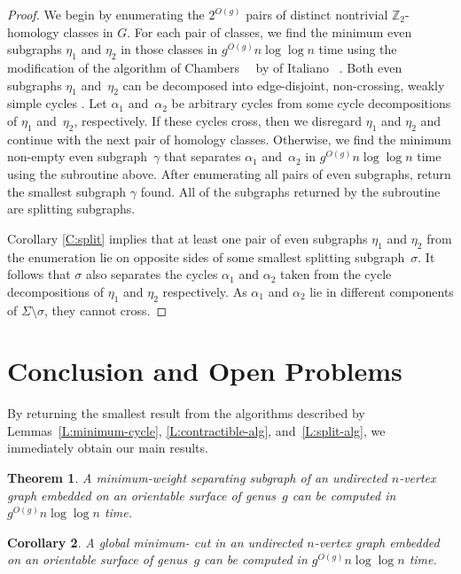 \documentclass[twoside,leqno,twocolumn]{article}
\def\Z{\mathbb{Z}}
\newtheorem{theorem}{Theorem}[section]
\newtheorem{corollary}[theorem]{Corollary}
\begin{document}
\begin{proof}
We begin by enumerating the $2^{O(g)}$ pairs of distinct nontrivial $\Z_2$-homology classes in $G$.  For each pair of classes, we find the minimum even subgraphs $\eta_1$ and $\eta_2$ in those classes in $g^{O(g)}n \log \log n$ time using the modification of the algorithm of Chambers~\etal~\cite{cen-mcshc-09} by of Italiano \etal~\cite{insw-iamcmf-11}.  Both even subgraphs $\eta_1$ and~$\eta_2$ can be decomposed into edge-disjoint, non-crossing, weakly simple cycles \cite[Lemma 3.2]{cen-mcshc-09}.  Let $\alpha_1$ and~$\alpha_2$ be arbitrary cycles from some cycle decompositions of $\eta_1$ and~$\eta_2$, respectively.  If these cycles cross, then we disregard $\eta_1$ and $\eta_2$ and continue with the next pair of homology classes.  Otherwise, we find the minimum non-empty even subgraph~$\gamma$ that separates $\alpha_1$ and~$\alpha_2$ in $g^{O(g)} n \log \log n$ time using the subroutine above.  After enumerating all pairs of even subgraphs, return the smallest subgraph $\gamma$ found.  All of the subgraphs returned by the subroutine are splitting subgraphs.

Corollary \ref{C:split} implies that at least one pair of even subgraphs $\eta_1$ and $\eta_2$ from the enumeration lie on opposite sides of some smallest splitting subgraph~$\sigma$.  It follows that $\sigma$ also separates the cycles $\alpha_1$ and $\alpha_2$ taken from the cycle decompositions of $\eta_1$ and $\eta_2$ respectively.  As $\alpha_1$ and $\alpha_2$ lie in different components of $\Sigma \setminus \sigma$, they cannot cross.
\end{proof}


\section{Conclusion and Open Problems}

By returning the smallest result from the algorithms described by
Lemmas~\ref{L:minimum-cycle}, \ref{L:contractible-alg}, and~\ref{L:split-alg},
we immediately obtain our main results.

\begin{theorem}
  A minimum-weight separating subgraph of an undirected $n$-vertex
  graph embedded on an orientable surface of genus~$g$ can be computed
  in $g^{O(g)} n \log \log n$ time.
\end{theorem}

\begin{corollary}
  A global minimum- cut in an undirected $n$-vertex graph embedded on
  an orientable surface of genus~$g$ can be computed in 
  $g^{O(g)} n \log \log n$ time.
\end{corollary}
\end{document}
